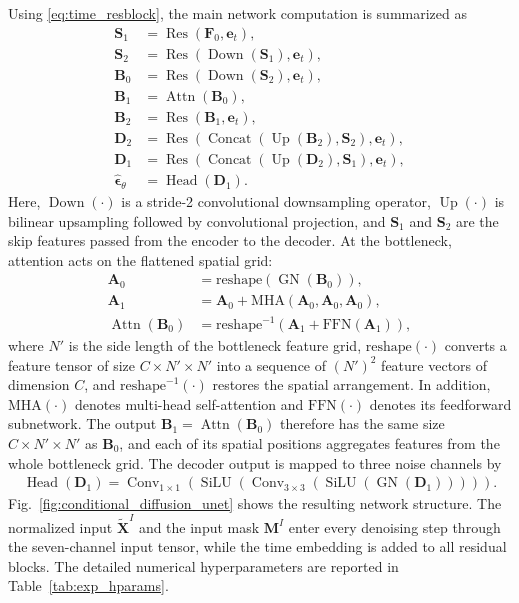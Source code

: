 \documentclass[lettersize,journal]{IEEEtran}
\newcommand{\vect}[1]{\boldsymbol{#1}}
\newcommand{\mat}[1]{\mathbf{#1}}
\DeclareMathOperator{\Concat}{Concat}
\DeclareMathOperator{\Conv}{Conv}
\DeclareMathOperator{\GN}{GN}
\DeclareMathOperator{\SiLU}{SiLU}
\DeclareMathOperator{\Res}{Res}
\DeclareMathOperator{\Down}{Down}
\DeclareMathOperator{\Up}{Up}
\DeclareMathOperator{\Attn}{Attn}
\DeclareMathOperator{\Head}{Head}
\begin{document}
Using \eqref{eq:time_resblock}, the main network computation is summarized as
\begin{align}
    \mat{S}_1 &= \Res(\mat{F}_0,\vect{e}_t), \\
    \mat{S}_2 &= \Res(\Down(\mat{S}_1),\vect{e}_t), \\
    \mat{B}_0 &= \Res(\Down(\mat{S}_2),\vect{e}_t), \\
    \mat{B}_1 &= \Attn(\mat{B}_0), \\
    \mat{B}_2 &= \Res(\mat{B}_1,\vect{e}_t), \\
    \mat{D}_2
    &= \Res\!\left(\Concat(\Up(\mat{B}_2),\mat{S}_2),\vect{e}_t\right), \\
    \mat{D}_1
    &= \Res\!\left(\Concat(\Up(\mat{D}_2),\mat{S}_1),\vect{e}_t\right), \\
    \widehat{\vect{\epsilon}}_{\theta}
    &= \Head(\mat{D}_1).
    \label{eq:diff_unet_computation}
\end{align}
Here, $\Down(\cdot)$ is a stride-2 convolutional downsampling operator, $\Up(\cdot)$ is bilinear upsampling followed by convolutional projection, and $\mat{S}_1$ and $\mat{S}_2$ are the skip features passed from the encoder to the decoder. At the bottleneck, attention acts on the flattened spatial grid:
\begin{align}
    \mat{A}_0 &= \mathrm{reshape}(\GN(\mat{B}_0)), \\
    \mat{A}_1 &= \mat{A}_0+\mathrm{MHA}(\mat{A}_0,\mat{A}_0,\mat{A}_0), \\
    \Attn(\mat{B}_0)
    &= \mathrm{reshape}^{-1}\!\left(\mat{A}_1+\mathrm{FFN}(\mat{A}_1)\right),
    \label{eq:bottleneck_attention}
\end{align}
where $N'$ is the side length of the bottleneck feature grid, $\mathrm{reshape}(\cdot)$ converts a feature tensor of size $C\times N'\times N'$ into a sequence of $(N')^2$ feature vectors of dimension $C$, and $\mathrm{reshape}^{-1}(\cdot)$ restores the spatial arrangement. In addition, $\mathrm{MHA}(\cdot)$ denotes multi-head self-attention and $\mathrm{FFN}(\cdot)$ denotes its feedforward subnetwork. The output $\mat{B}_1=\Attn(\mat{B}_0)$ therefore has the same size $C\times N'\times N'$ as $\mat{B}_0$, and each of its spatial positions aggregates features from the whole bottleneck grid. The decoder output is mapped to three noise channels by
\begin{align}
    \Head(\mat{D}_1)
    =
    \Conv_{1\times1}\!\left(
    \SiLU(\Conv_{3\times3}(\SiLU(\GN(\mat{D}_1))))
    \right).
    \label{eq:diff_output_head}
\end{align}
Fig.~\ref{fig:conditional_diffusion_unet} shows the resulting network structure. The normalized input $\widetilde{\mat{X}}^{I}$ and the input mask $\mat{M}^{I}$ enter every denoising step through the seven-channel input tensor, while the time embedding is added to all residual blocks. The detailed numerical hyperparameters are reported in Table~\ref{tab:exp_hparams}.
\end{document}
